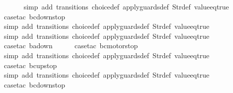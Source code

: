 \begin{isabellebody}
\ \ \ \ \ \isamarkupfalse%
\ {\isacharparenleft}simp\ add{\isacharcolon}\ transitions\ choice{\isacharunderscore}def\ apply{\isacharunderscore}guards{\isacharunderscore}def\ Str{\isacharunderscore}def\ value{\isacharunderscore}eq{\isacharunderscore}true{\isacharparenright}\isanewline
\ \ \ \ \isamarkupfalse%
\ {\isacharparenleft}case{\isacharunderscore}tac\ {\isachardoublequoteopen}bc{\isacharequal}down{}{}stop{\isachardoublequoteclose}{\isacharparenright}\isanewline
\ \ \ \ \ \isamarkupfalse%
\ {\isacharparenleft}simp\ add{\isacharcolon}\ transitions\ choice{\isacharunderscore}def\ apply{\isacharunderscore}guards{\isacharunderscore}def\ Str{\isacharunderscore}def\ value{\isacharunderscore}eq{\isacharunderscore}true{\isacharparenright}\isanewline
\ \ \isamarkupfalse%
\ {\isacharparenleft}simp\ add{\isacharcolon}\ transitions\ choice{\isacharunderscore}def\ apply{\isacharunderscore}guards{\isacharunderscore}def\ Str{\isacharunderscore}def\ value{\isacharunderscore}eq{\isacharunderscore}true{\isacharparenright}\isanewline
\ \isamarkupfalse%
\ {\isacharparenleft}case{\isacharunderscore}tac\ {\isachardoublequoteopen}ba{\isacharequal}down{}{}{\isachardoublequoteclose}{\isacharparenright}\isanewline
\ \ \ \ \isamarkupfalse%
\ {\isacharparenleft}case{\isacharunderscore}tac\ {\isachardoublequoteopen}bc{\isacharequal}motorstop{}{\isachardoublequoteclose}{\isacharparenright}\isanewline
\ \ \ \ \ \isamarkupfalse%
\ {\isacharparenleft}simp\ add{\isacharcolon}\ transitions\ choice{\isacharunderscore}def\ apply{\isacharunderscore}guards{\isacharunderscore}def\ Str{\isacharunderscore}def\ value{\isacharunderscore}eq{\isacharunderscore}true{\isacharparenright}\isanewline
\ \ \ \ \isamarkupfalse%
\ {\isacharparenleft}case{\isacharunderscore}tac\ {\isachardoublequoteopen}bc{\isacharequal}up{}{}stop{\isachardoublequoteclose}{\isacharparenright}\isanewline
\ \ \ \ \ \isamarkupfalse%
\ {\isacharparenleft}simp\ add{\isacharcolon}\ transitions\ choice{\isacharunderscore}def\ apply{\isacharunderscore}guards{\isacharunderscore}def\ Str{\isacharunderscore}def\ value{\isacharunderscore}eq{\isacharunderscore}true{\isacharparenright}\isanewline
\ \ \ \ \isamarkupfalse%
\ {\isacharparenleft}case{\isacharunderscore}tac\ {\isachardoublequoteopen}bc{\isacharequal}down{}{}stop{\isachardoublequoteclose}{\isacharparenright}\isanewline

\end{isabellebody}
